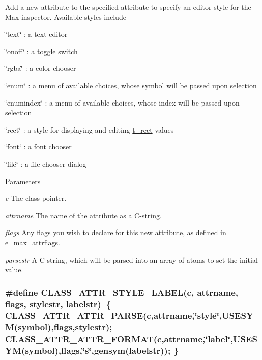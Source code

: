 Add a new attribute to the specified attribute to specify an editor style for the Max inspector. Available styles include 
\begin{DoxyItemize}
\item \char`\"{}text\char`\"{} : a text editor 
\item \char`\"{}onoff\char`\"{} : a toggle switch 
\item \char`\"{}rgba\char`\"{} : a color chooser 
\item \char`\"{}enum\char`\"{} : a menu of available choices, whose symbol will be passed upon selection 
\item \char`\"{}enumindex\char`\"{} : a menu of available choices, whose index will be passed upon selection 
\item \char`\"{}rect\char`\"{} : a style for displaying and editing \hyperlink{structt__rect}{t\_\-rect} values 
\item \char`\"{}font\char`\"{} : a font chooser 
\item \char`\"{}file\char`\"{} : a file chooser dialog 
\end{DoxyItemize}


\begin{DoxyParams}{Parameters}
\item[{\em c}]The class pointer. \item[{\em attrname}]The name of the attribute as a C-\/string. \item[{\em flags}]Any flags you wish to declare for this new attribute, as defined in \hyperlink{group__attr_gaf296cfc6741bb19207f6ed8062809115}{e\_\-max\_\-attrflags}. \item[{\em parsestr}]A C-\/string, which will be parsed into an array of atoms to set the initial value. \end{DoxyParams}
\hypertarget{group__attr_ga1a55732bfe15aff297a7a025ce578d6e}{
\subsubsection[{CLASS\_\-ATTR\_\-STYLE\_\-LABEL}]{\setlength{\rightskip}{0pt plus 5cm}\#define CLASS\_\-ATTR\_\-STYLE\_\-LABEL(c, \/  attrname, \/  flags, \/  stylestr, \/  labelstr)~\{ CLASS\_\-ATTR\_\-ATTR\_\-PARSE(c,attrname,\char`\"{}style\char`\"{},USESYM(symbol),flags,stylestr); CLASS\_\-ATTR\_\-ATTR\_\-FORMAT(c,attrname,\char`\"{}label\char`\"{},USESYM(symbol),flags,\char`\"{}s\char`\"{},gensym(labelstr)); \}}}
\label{group__attr_ga1a55732bfe15aff297a7a025ce578d6e}


